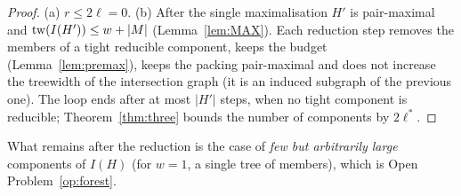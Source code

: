 \begin{proof}
(a) $r\le2\ell=0$. (b) After the single maximalisation $H'$ is pair-maximal and $\mathrm{tw}(I(H'))\le w+|M|$ (Lemma~\ref{lem:MAX}). Each reduction step removes the members of a tight reducible component, keeps the budget (Lemma~\ref{lem:premax}), keeps the packing pair-maximal and does not increase the treewidth of the intersection graph (it is an induced subgraph of the previous one). The loop ends after at most $|H'|$ steps, when no tight component is reducible; Theorem~\ref{thm:three} bounds the number of components by $2\ell^*$.
\end{proof}
What remains after the reduction is the case of \emph{few but arbitrarily large} components of $I(H)$ (for $w=1$, a single tree of members), which is Open Problem~\ref{op:forest}.
